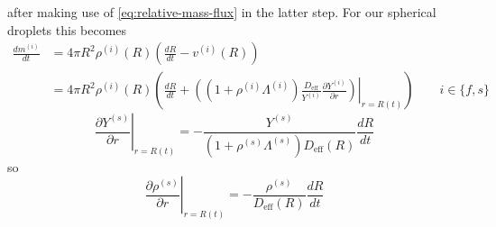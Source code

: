 \documentclass[11pt,twoside]{report}
\begin{document}
after making use of \eqref{eq:relative-mass-flux} in the latter step.
For our spherical droplets this becomes
\begin{equation}
  \begin{aligned}
    \frac{d m^{(i)}}{dt} &=
    4 \pi R^2
    \rho^{(i)}(R) \left( \frac{dR}{dt} - v^{(i)}(R) \right) \\
    &=
    4 \pi R^2
    \rho^{(i)}(R) \left(
    \frac{dR}{dt} +
    \left.\left(
    (1 + \rho^{(i)} \Lambda^{(i)})
    \frac{D_{\textrm{eff}}}{Y^{(i)}}
    \frac{\partial Y^{(i)}}{\partial r}
    \right)\right|_{r=R(t)}
    \right)
    \qquad i \in \{f,s\}
  \end{aligned}
\end{equation}
\begin{equation}
  \left. \frac{\partial Y^{(s)}}{\partial r} \right|_{r=R(t)} =
  -
  \frac{Y^{(s)}}{(1 + \rho^{(s)} \Lambda^{(s)}) D_{\textrm{eff}}(R)}
  \frac{dR}{dt}
\end{equation}
so
\begin{equation}
  \left. \frac{\partial \rho^{(s)}}{\partial r} \right|_{r=R(t)} =
  -
  \frac{\rho^{(s)}}{D_{\textrm{eff}}(R)}
  \frac{dR}{dt}
\end{equation}
\end{document}
